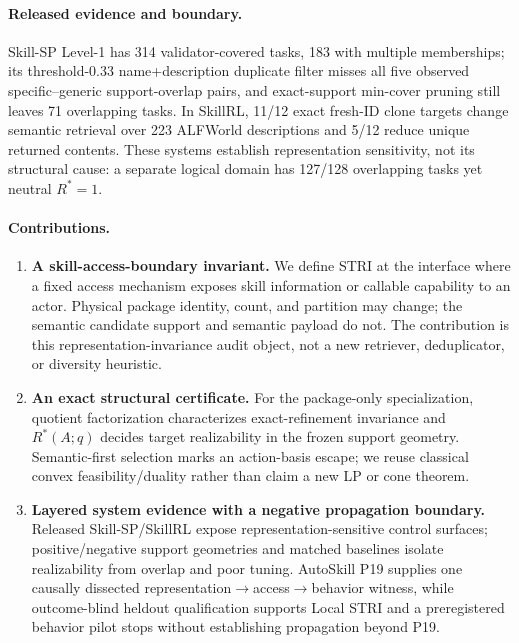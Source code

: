 \paragraph{Released evidence and boundary.} Skill-SP Level-1 has 314 validator-covered tasks, 183 with multiple memberships; its threshold-0.33 name+description duplicate filter misses all five observed specific--generic support-overlap pairs, and exact-support min-cover pruning still leaves 71 overlapping tasks. In SkillRL, 11/12 exact fresh-ID clone targets change semantic retrieval over 223 ALFWorld descriptions and 5/12 reduce unique returned contents. These systems establish representation sensitivity, not its structural cause: a separate logical domain has 127/128 overlapping tasks yet neutral $R^*=1$.

\paragraph{Contributions.}
\begin{enumerate}[leftmargin=*]
\item \textbf{A skill-access-boundary invariant.} We define STRI at the interface where a fixed access mechanism exposes skill information or callable capability to an actor. Physical package identity, count, and partition may change; the semantic candidate support and semantic payload do not. The contribution is this representation-invariance audit object, not a new retriever, deduplicator, or diversity heuristic.
\item \textbf{An exact structural certificate.} For the package-only specialization, quotient factorization characterizes exact-refinement invariance and $R^*(A;q)$ decides target realizability in the frozen support geometry. Semantic-first selection marks an action-basis escape; we reuse classical convex feasibility/duality rather than claim a new LP or cone theorem.
\item \textbf{Layered system evidence with a negative propagation boundary.} Released Skill-SP/SkillRL expose representation-sensitive control surfaces; positive/negative support geometries and matched baselines isolate realizability from overlap and poor tuning. AutoSkill P19 supplies one causally dissected representation$\rightarrow$access$\rightarrow$behavior witness, while outcome-blind heldout qualification supports Local STRI and a preregistered behavior pilot stops without establishing propagation beyond P19.
\end{enumerate}

